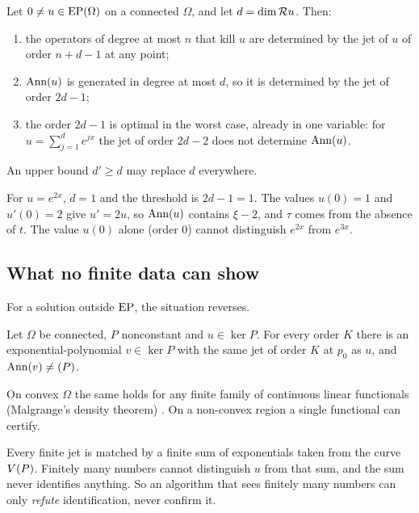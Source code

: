 \begin{theorem}\label{thm:jet-threshold}
Let $0\ne u\in\mathrm{EP}(\Omega)$ on a connected $\Omega$, and let $d=\operatorname{dim}\mathcal{R} u$. Then:
\begin{enumerate}[label=(\roman*)]
\item the operators of degree at most $n$ that kill $u$ are determined by the jet of $u$ of order $n+d-1$ at any point;
\item $\operatorname{Ann}(u)$ is generated in degree at most $d$, so it is determined by the jet of order $2d-1$;
\item the order $2d-1$ is optimal in the worst case, already in one variable: for $u=\sum_{j=1}^de^{jx}$ the jet of order $2d-2$ does not determine $\operatorname{Ann}(u)$.
\end{enumerate}
An upper bound $d'\ge d$ may replace $d$ everywhere.

\end{theorem}

\begin{example}[{One exponential, $d=1$}]
For $u=e^{2x}$, $d=1$ and the threshold is $2d-1=1$. The values $u(0)=1$ and $u'(0)=2$ give $u'=2u$, so $\operatorname{Ann}(u)$ contains $\xi-2$, and $\tau$ comes from the absence of $t$. The value $u(0)$ alone (order $0$) cannot distinguish $e^{2x}$ from $e^{3x}$.
\end{example}

\subsection{What no finite data can show}

For a solution outside $\mathrm{EP}$, the situation reverses.

\begin{theorem}\label{f:thm:nocert}
Let $\Omega$ be connected, $P$ nonconstant and $u\in\ker P$. For every order $K$ there is an exponential-polynomial $v\in\ker P$ with the same jet of order $K$ at $p_0$ as $u$, and $\operatorname{Ann}(v)\ne(P)$.

On convex $\Omega$ the same holds for any finite family of continuous linear functionals (Malgrange's density theorem) \cf. On a non-convex region a single functional can certify.

\end{theorem}

\begin{intuition}
Every finite jet is matched by a finite sum of exponentials taken from the curve $V(P)$. Finitely many numbers cannot distinguish $u$ from that sum, and the sum never identifies anything. So an algorithm that sees finitely many numbers can only \emph{refute} identification, never confirm it.
\end{intuition}


